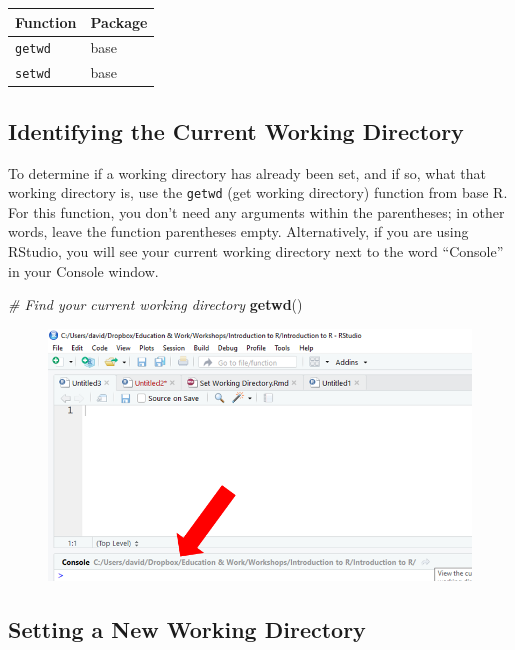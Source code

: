 \documentclass[]{book}
\newenvironment{Shaded}{\begin{snugshade}}{\end{snugshade}}
\newcommand{\KeywordTok}[1]{\textcolor[rgb]{0.13,0.29,0.53}{\textbf{#1}}}
\newcommand{\CommentTok}[1]{\textcolor[rgb]{0.56,0.35,0.01}{\textit{#1}}}
\newcommand{\NormalTok}[1]{#1}
\begin{document}
\begin{longtable}[]{@{}ll@{}}
\toprule
Function & Package\tabularnewline
\midrule
\endhead
\texttt{getwd} & base\tabularnewline
\texttt{setwd} & base\tabularnewline
\bottomrule
\end{longtable}

\subsection{Identifying the Current Working
Directory}\label{identifying-the-current-working-directory}

To determine if a working directory has already been set, and if so,
what that working directory is, use the \texttt{getwd} (get working
directory) function from base R. For this function, you don't need any
arguments within the parentheses; in other words, leave the function
parentheses empty. Alternatively, if you are using RStudio, you will see
your current working directory next to the word ``Console'' in your
Console window.

\begin{Shaded}
\begin{Highlighting}[]
\CommentTok{# Find your current working directory}
\KeywordTok{getwd}\NormalTok{()}
\end{Highlighting}
\end{Shaded}

\begin{figure}
\centering
\includegraphics{ConsoleWD.png}
\caption{}
\end{figure}

\subsection{Setting a New Working
Directory}\label{setting-a-new-working-directory}
\end{document}
